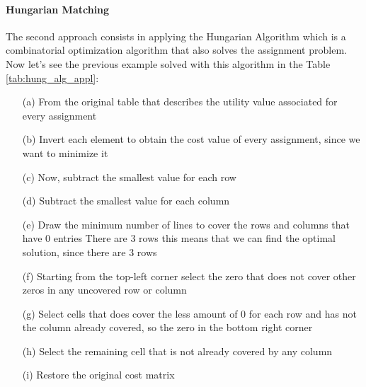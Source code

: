 \paragraph{Hungarian Matching}
The second approach consists in applying the Hungarian Algorithm which is a combinatorial optimization algorithm that also solves the assignment problem.\\
Now let's see the previous example solved with this algorithm in the Table \ref{tab:hung_alg_appl}: 
\begin{enumerate}
  \item[(a)] From the original table that describes the utility value associated for every assignment
  \item[(b)] Invert each element to obtain the cost value of every assignment, since we want to minimize it 
  \item[(c)] Now, subtract the smallest value for each row
  \item[(d)] Subtract the smallest value for each column 
  \item[(e)] Draw the minimum number of lines to cover the rows and columns that have 0 entries
            There are 3 rows this means that we can find the optimal solution, since there are 3 rows
  \item[(f)] Starting from the top-left corner select the zero that does not cover other zeros in any uncovered row or column
  \item[(g)] Select cells that does cover the less amount of 0 for each row and has not the column already covered, so the zero in the bottom right corner
  \item[(h)] Select the remaining cell that is not already covered by any column
  \item[(i)] Restore the original cost matrix 
\end{enumerate}

